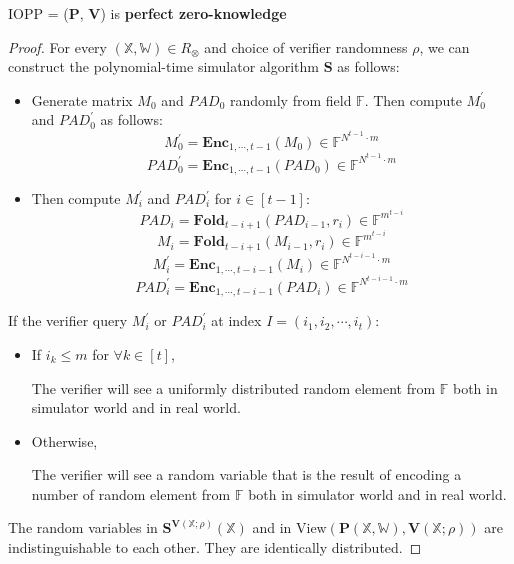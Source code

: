 \begin{lemma}
\label{lemma:szkpc-zk}

IOPP = ($\textbf{P}$, $\textbf{V}$) is \textbf{perfect zero-knowledge}

\end{lemma}
\begin{proof}

For every $(\mathbb{X}, \mathbb{W}) \in R_\otimes$ and choice of verifier randomness $\rho$, we can construct the polynomial-time simulator algorithm $\textbf{S}$ as follows:


\begin{itemize}
    \item Generate matrix $M_0$ and $PAD_0$ randomly from field $\mathbb{F}$. Then compute $M_0^\prime$ and $PAD_0^\prime$ as follows:
    $$
        M_0^{\prime} = \textbf{Enc}_{1,\cdots,t-1}(M_0) \in \mathbb{F}^{N^{t-1} \cdot m}
    $$
    $$
        PAD_0^{\prime} = \textbf{Enc}_{1,\cdots,t-1}(PAD_0) \in \mathbb{F}^{N^{t-1} \cdot m}
    $$
    \item Then compute $M_i^{\prime}$ and $PAD_i^\prime$ for $i \in [t-1]$:
    $$
        PAD_i = \textbf{Fold}_{t-i+1}(PAD_{i-1}, r_i) \in \mathbb{F}^{m^{t-i}}
    $$
    $$
        M_i = \textbf{Fold}_{t-i+1}(M_{i-1}, r_i) \in \mathbb{F}^{m^{t-i}}
    $$
    $$
        M_i^\prime =  \textbf{Enc}_{1, \cdots, t- i - 1}(M_i) \in \mathbb{F}^{N^{t-i-1} \cdot m}
    $$
    $$
        PAD_i^\prime =  \textbf{Enc}_{1, \cdots, t- i - 1}(PAD_i) \in \mathbb{F}^{N^{t-i-1} \cdot m}
    $$
\end{itemize}

If the verifier query $M_i^{\prime}$ or $PAD_i^\prime$ at index $I = (i_1, i_2, \cdots, i_t)$:

\begin{itemize}
    \item If $i_k \le m$ for $\forall k \in [t]$,
    
    The verifier will see a uniformly distributed random element from $\mathbb{F}$ both in simulator world and in real world.
    
    \item Otherwise,
    
    The verifier will see a random variable that is the result of encoding a number of random element from $\mathbb{F}$ both in simulator world and in real world.
    
    
\end{itemize}



The random variables in $\textbf{S}^{\textbf{V}(\mathbb{X};\rho)}(\mathbb{X})$ and in $\text{View}(\textbf{P}(\mathbb{X}, \mathbb{W}), \textbf{V}(\mathbb{X};\rho))$ are indistinguishable to each other. They are identically distributed.

\end{proof}